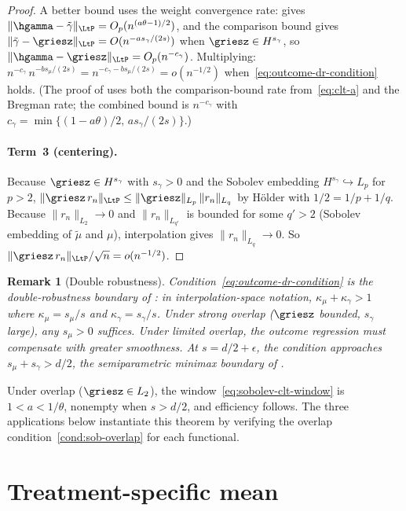 \documentclass{article}
\newtheorem{remark}{Remark}[section]
\begin{document}
\begin{proof}
A better bound uses the weight
convergence rate:
gives $\|\hgamma - \tilde\gamma\|_{\LtP}
  = O_p(n^{(a\theta-1)/2})$,
and the comparison bound gives
$\|\tilde\gamma - \griesz\|_{\LtP}
  = O(n^{-as_\gamma/(2s)})$
when $\griesz \in H^{s_\gamma}$,
so
$\|\hgamma - \griesz\|_{\LtP}
  = O_p(n^{-c_\gamma})$.
Multiplying:
$n^{-c_\gamma}\,n^{-bs_\mu/(2s)}
  = n^{-c_\gamma - bs_\mu/(2s)}
  = o(n^{-1/2})$
when~\eqref{eq:outcome-dr-condition} holds.
(The proof of 
uses both the comparison-bound rate
from~\eqref{eq:clt-a}
and the Bregman rate;
the combined bound is
$n^{-c_\gamma}$
with $c_\gamma
  = \min\{(1-a\theta)/2,\,as_\gamma/(2s)\}$.)

\paragraph{Term~3 (centering).}
Because $\griesz \in H^{s_\gamma}$
with $s_\gamma > 0$
and the Sobolev embedding
$H^{s_\gamma} \hookrightarrow L_p$
for $p > 2$,
$\|\griesz\,r_n\|_{\LtP}
  \le \|\griesz\|_{L_p}\,\|r_n\|_{L_q}$
by H\"older
with $1/2 = 1/p + 1/q$.
Because $\|r_n\|_{L_2} \to 0$
and $\|r_n\|_{L_{q'}}$
is bounded for some $q' > 2$
(Sobolev embedding of $\tilde\mu$ and $\mu$),
interpolation gives $\|r_n\|_{L_q} \to 0$.
So $\|\griesz\,r_n\|_{\LtP}/\sqrt{n}
  = o(n^{-1/2})$.
\end{proof}

\begin{remark}[Double robustness]
\label{rem:double-robustness}
Condition~\eqref{eq:outcome-dr-condition}
is the double-robustness boundary
of \citet{hirshberg2025retargeted}:
in interpolation-space notation,
$\kappa_\mu + \kappa_\gamma > 1$
where $\kappa_\mu = s_\mu/s$
and $\kappa_\gamma = s_\gamma/s$.
Under strong overlap
($\griesz$ bounded, $s_\gamma$ large),
any $s_\mu > 0$ suffices.
Under limited overlap,
the outcome regression
must compensate
with greater smoothness.
At $s = d/2 + \epsilon$,
the condition approaches $s_\mu + s_\gamma > d/2$,
the semiparametric minimax boundary
of \citet{robins2009semiparametric}.
\end{remark}

Under overlap ($\griesz \in L_2$),
the window~\eqref{eq:sobolev-clt-window}
is $1 < a < 1/\theta$,
nonempty when $s > d/2$,
and efficiency follows.
The three applications below
instantiate this theorem
by verifying the overlap
condition~\ref{cond:sob-overlap}
for each functional.

\section{Treatment-specific mean}
\label{sec:app-tsm}
\end{document}
